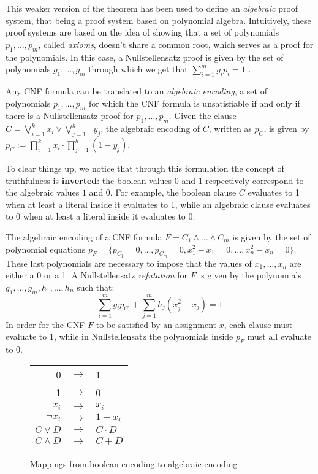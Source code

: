 This weaker version of the theorem has been used to define an \textit{algebraic} proof system, that being a proof system based on polynomial algebra. Intuitively, these proof systems are based on the idea of showing that a set of polynomials $p_1, \ldots, p_m$, called \textit{axioms}, doesn't share a common root, which serves as a proof for the polynomials. In this case, a Nullstellensatz proof is given by the set of polynomials $g_1, \ldots, g_m$ through which we get that $\sum_{i=1}^m g_ip_i = 1$  \cite{ns_definitions}. 

Any CNF formula can be translated to an \textit{algebraic encoding}, a set of polynomials $p_1, \ldots, p_m$ for which the CNF formula is unsatisfiable if and only if there is a Nullstellensatz proof for $p_1, \ldots, p_m$. Given the clause $C = \bigvee_{i = 1}^k x_i \lor \bigvee_{j = 1}^h \lnot y_j$, the algebraic encoding of $C$, written as $p_C$, is given by $p_C := \prod_{i = 1}^{k} x_i \cdot \prod_{j = 1}^h (1- y_j)$. 

To clear things up, we notice that through this formulation the concept of truthfulness is \textbf{inverted}: the boolean values $0$ and $1$ respectively correspond to the algebraic values $1$ and $0$. For example, the boolean clause $C$ evaluates to 1 when at least a literal inside it evaluates to 1, while an algebraic clause evaluates to 0 when at least a literal inside it evaluates to 0.

The algebraic encoding of a CNF formula $F = C_1 \land \ldots \land C_m$ is given by the set of polynomial equations $p_F = \{p_{C_1} = 0, \ldots, p_{C_m} = 0, x_1^2-x_1 = 0, \ldots, x_n^2-x_n = 0\}$. These last polynomials are necessary to impose that the values of $x_1, \ldots, x_n$ are either a 0 or a 1. A Nullstellensatz \textit{refutation} for $F$ is given by the polynomials $g_1, \ldots, g_m, h_1, \ldots, h_n$ such that:
\[\sum_{i = 1}^m g_ip_{C_i} + \sum_{j = 1}^m h_j(x_j^2-x_j) = 1\]
In order for the CNF $F$ to be satisfied by an assignment $x$, each clause must evaluate to 1, while in Nullstellensatz the polynomials inside $p_F$ must all evaluate to 0. 

\begin{figure}[H]
    \centering
    \begin{tabular}{r c l}
 0 & $\longrightarrow$ & 1 \\
 1 & $\longrightarrow$ & 0 \\
        $x_i$ & $\longrightarrow$ & $x_i$ \\
        $\lnot x_i$ & $\longrightarrow$ & $1-x_i$ \\
        $C \lor D$ & $\longrightarrow$ & $C \cdot D$ \\
        $C \land D$ & $\longrightarrow$ & $C + D$ \\
    \end{tabular}

    \caption{Mappings from boolean encoding to algebraic encoding}
\end{figure}

